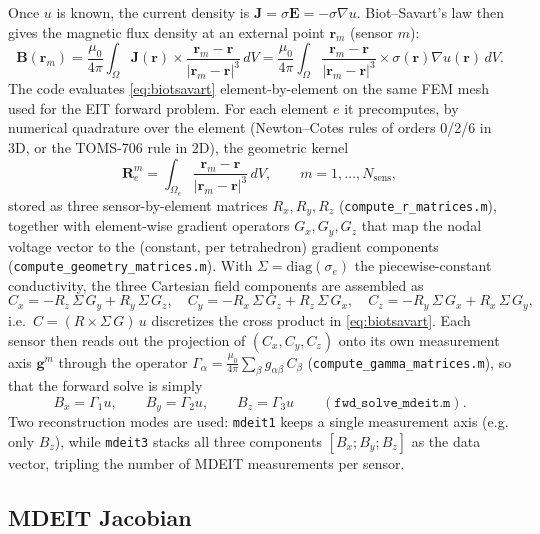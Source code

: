 \documentclass[11pt]{article}
\newcommand{\bB}{\mathbf{B}}
\newcommand{\bJ}{\mathbf{J}}
\newcommand{\bE}{\mathbf{E}}
\newcommand{\br}{\mathbf{r}}
\newcommand{\bg}{\mathbf{g}}
\begin{document}
Once $u$ is known, the current density is $\bJ = \sigma\bE = -\sigma\nabla u$. Biot--Savart's law then gives the magnetic flux density at an external point $\br_m$ (sensor $m$):
\begin{equation}
\bB(\br_m) = \frac{\mu_0}{4\pi}\int_\Omega \bJ(\br)\times\frac{\br_m-\br}{|\br_m-\br|^3}\,dV
= \frac{\mu_0}{4\pi}\int_\Omega \frac{\br_m-\br}{|\br_m-\br|^3}\times\sigma(\br)\nabla u(\br)\,dV. \label{eq:biotsavart}
\end{equation}
The code evaluates \eqref{eq:biotsavart} element-by-element on the same FEM mesh used for the EIT forward problem. For each element $e$ it precomputes, by numerical quadrature over the element (Newton--Cotes rules of orders 0/2/6 in 3D, or the TOMS-706 rule in 2D), the geometric kernel
\begin{equation}
\mathbf{R}_e^m = \int_{\Omega_e}\frac{\br_m-\br}{|\br_m-\br|^3}\,dV, \qquad m = 1,\dots,N_\text{sens},
\end{equation}
stored as three sensor-by-element matrices $R_x,R_y,R_z$ (\texttt{compute\_r\_matrices.m}), together with element-wise gradient operators $G_x,G_y,G_z$ that map the nodal voltage vector to the (constant, per tetrahedron) gradient components (\texttt{compute\_geometry\_matrices.m}). With $\Sigma=\mathrm{diag}(\sigma_e)$ the piecewise-constant conductivity, the three Cartesian field components are assembled as
\begin{equation}
C_x = -R_z\,\Sigma\,G_y + R_y\,\Sigma\,G_z,\quad
C_y = -R_x\,\Sigma\,G_z + R_z\,\Sigma\,G_x,\quad
C_z = -R_y\,\Sigma\,G_x + R_x\,\Sigma\,G_y,
\end{equation}
i.e.\ $C=(R\times\Sigma\, G) \, u$ discretizes the cross product in \eqref{eq:biotsavart}. Each sensor then reads out the projection of $(C_x,C_y,C_z)$ onto its own measurement axis $\bg^m$ through the operator $\Gamma_\alpha = \frac{\mu_0}{4\pi}\sum_\beta g_{\alpha\beta}\,C_\beta$ (\texttt{compute\_gamma\_matrices.m}), so that the forward solve is simply
\begin{equation}
B_x = \Gamma_1 u,\qquad B_y=\Gamma_2 u, \qquad B_z = \Gamma_3 u \qquad (\texttt{fwd\_solve\_mdeit.m}).
\end{equation}
Two reconstruction modes are used: \texttt{mdeit1} keeps a single measurement axis (e.g. only $B_z$), while \texttt{mdeit3} stacks all three components $[B_x;B_y;B_z]$ as the data vector, tripling the number of MDEIT measurements per sensor.

\subsection{MDEIT Jacobian}
\end{document}
